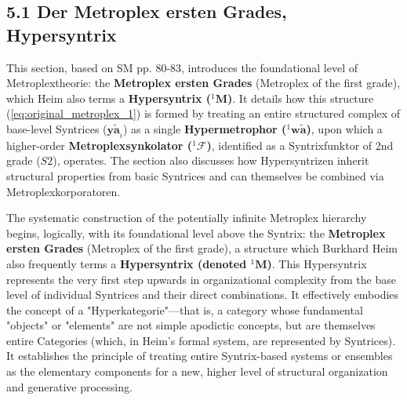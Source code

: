 \documentclass[12pt]{article}
\newcommand{\syntrix}{\bm{y\widetilde{a}}}
\newcommand{\metroplex}[1]{{}^{#1}\mathbf{M}}
\newcommand{\hypersyntrix}{\metroplex{1}}
\newcommand{\hypermetrophor}[1]{{}^{#1}\mathbf{w\widetilde{a}}}
\newcommand{\metroplexsynkolator}[1]{{}^{#1}\mathcal{F}}
\begin{document}
\subsection{5.1 Der Metroplex ersten Grades, Hypersyntrix}
\label{sec:hypersyntrix}

This section, based on SM pp. 80-83, introduces the foundational level of Metroplextheorie: the \textbf{Metroplex ersten Grades} (Metroplex of the first grade), which Heim also terms a \textbf{Hypersyntrix (\(\hypersyntrix\))}. It details how this structure (\eqref{eq:original_metroplex_1}) is formed by treating an entire structured complex of base-level Syntrices (\(\syntrix_i\)) as a single \textbf{Hypermetrophor (\(\hypermetrophor{1}\))}, upon which a higher-order \textbf{Metroplexsynkolator (\(\metroplexsynkolator{1}\))}, identified as a Syntrixfunktor of 2nd grade (\(S2\)), operates. The section also discusses how Hypersyntrizen inherit structural properties from basic Syntrices and can themselves be combined via Metroplexkorporatoren.

The systematic construction of the potentially infinite Metroplex hierarchy begins, logically, with its foundational level above the Syntrix: the \textbf{Metroplex ersten Grades} (Metroplex of the first grade), a structure which Burkhard Heim also frequently terms a \textbf{Hypersyntrix (denoted \(\hypersyntrix\))}. This Hypersyntrix represents the very first step upwards in organizational complexity from the base level of individual Syntrices and their direct combinations. It effectively embodies the concept of a "Hyperkategorie"—that is, a category whose fundamental "objects" or "elements" are not simple apodictic concepts, but are themselves entire Categories (which, in Heim's formal system, are represented by Syntrices). It establishes the principle of treating entire Syntrix-based systems or ensembles as the elementary components for a new, higher level of structural organization and generative processing.
\end{document}
